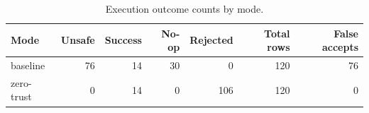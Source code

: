 \begin{table}[htbp]
\centering
\caption{Execution outcome counts by mode.}
\label{tab:phase4_outcomes_by_mode}
\begin{tabular}{lrrrrrr}
\hline
Mode & Unsafe & Success & No-op & Rejected & Total rows & False accepts \\
\hline
baseline & 76 & 14 & 30 & 0 & 120 & 76 \\
zero-trust & 0 & 14 & 0 & 106 & 120 & 0 \\
\hline
\end{tabular}
\end{table}

